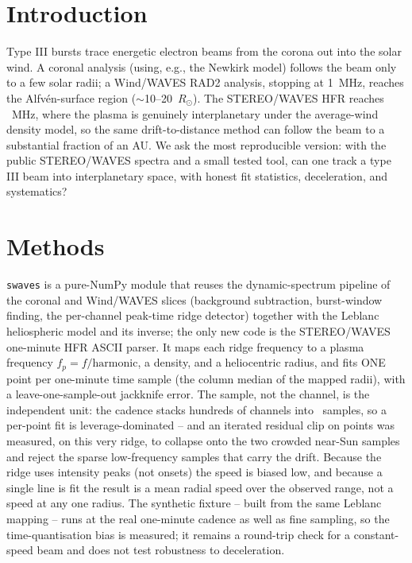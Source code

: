 \documentclass[twocolumn]{aastex631}
\newcommand{\code}[1]{\texttt{#1}}
\begin{document}
\section{Introduction}
Type III bursts trace energetic electron beams from the corona out into the solar wind. A coronal
analysis (using, e.g., the Newkirk model) follows the beam only to a few solar radii; a Wind/WAVES
RAD2 analysis, stopping at 1~MHz, reaches the Alfv\'en-surface region ($\sim$10--20~$R_\odot$). The
STEREO/WAVES HFR \citep{bougeret2008} reaches \swRealFlo~MHz, where the plasma is genuinely interplanetary under the average-wind density model,
so the same drift-to-distance method can follow the beam to a substantial fraction of an AU. We ask the
most reproducible version: with the public STEREO/WAVES spectra and a small tested tool, can one track a
type III beam into interplanetary space, with honest fit statistics, deceleration, and systematics?

\section{Methods}
\code{swaves} is a pure-NumPy module that reuses the dynamic-spectrum pipeline of the coronal and
Wind/WAVES slices (background subtraction, burst-window finding, the per-channel peak-time ridge
detector) together with the Leblanc heliospheric model and its inverse;
the only new code is the STEREO/WAVES one-minute HFR ASCII parser. It maps each ridge frequency to a
plasma frequency $f_p=f/\mathrm{harmonic}$, a density, and a heliocentric radius, and fits ONE point
per one-minute time sample (the column median of the mapped radii), with a leave-one-sample-out
jackknife error. The sample, not the channel, is the independent unit: the cadence stacks hundreds
of channels into \swRealNtimeCols\ samples, so a per-point fit is leverage-dominated -- and an
iterated residual clip on points was measured, on this very ridge, to collapse onto the two
crowded near-Sun samples and reject the sparse low-frequency samples that carry the drift. Because
the ridge uses intensity peaks (not onsets) the speed is biased low, and because a single line is
fit the result is a mean radial speed over the observed range, not a speed at any one radius. The
synthetic fixture -- built from the same Leblanc mapping -- runs at the real one-minute cadence as
well as fine sampling, so the time-quantisation bias is measured; it remains a round-trip check
for a constant-speed beam and does not test robustness to deceleration.
\end{document}
